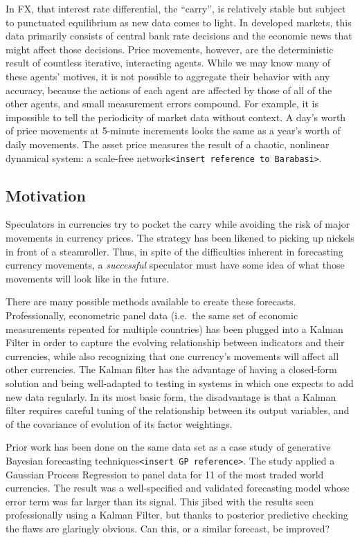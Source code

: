 \documentclass[]{article}
\begin{document}
In FX, that interest rate differential, the ``carry'', is relatively
stable but subject to punctuated equilibrium as new data comes to light.
In developed markets, this data primarily consists of central bank rate
decisions and the economic news that might affect those decisions. Price
movements, however, are the deterministic result of countless iterative,
interacting agents. While we may know many of these agents' motives, it
is not possible to aggregate their behavior with any accuracy, because
the actions of each agent are affected by those of all of the other
agents, and small measurement errors compound. For example, it is
impossible to tell the periodicity of market data without context. A
day's worth of price movements at 5-minute increments looks the same as
a year's worth of daily movements. The asset price measures the result
of a chaotic, nonlinear dynamical system: a scale-free
network\texttt{\textless{}insert\ reference\ to\ Barabasi\textgreater{}}.

\subsection{Motivation}\label{motivation}

Speculators in currencies try to pocket the carry while avoiding the
risk of major movements in currency prices. The strategy has been
likened to picking up nickels in front of a steamroller. Thus, in spite
of the difficulties inherent in forecasting currency movements, a
\emph{successful} speculator must have some idea of what those movements
will look like in the future.

There are many possible methods available to create these forecasts.
Professionally, econometric panel data (i.e.~the same set of economic
measurements repeated for multiple countries) has been plugged into a
Kalman Filter in order to capture the evolving relationship between
indicators and their currencies, while also recognizing that one
currency's movements will affect all other currencies. The Kalman filter
has the advantage of having a closed-form solution and being
well-adapted to testing in systems in which one expects to add new data
regularly. In its most basic form, the disadvantage is that a Kalman
filter requires careful tuning of the relationship between its output
variables, and of the covariance of evolution of its factor weightings.

Prior work has been done on the same data set as a case study of
generative Bayesian forecasting
techniques\texttt{\textless{}insert\ GP\ reference\textgreater{}}. The
study applied a Gaussian Process Regression to panel data for 11 of the
most traded world currencies. The result was a well-specified and
validated forecasting model whose error term was far larger than its
signal. This jibed with the results seen professionally using a Kalman
Filter, but thanks to posterior predictive checking the flaws are
glaringly obvious. Can this, or a similar forecast, be improved?
\end{document}

